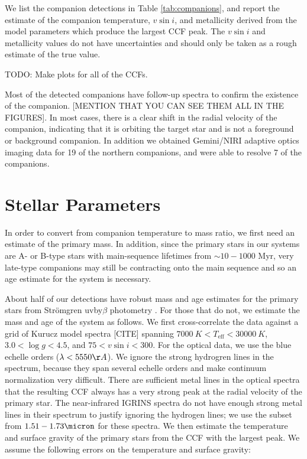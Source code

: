 \documentclass{emulateapj}
\begin{document}
We list the companion detections in Table \ref{tab:companions}, and report the estimate of the companion temperature, $v\sin{i}$, and metallicity derived from the model parameters which produce the largest CCF peak. The $v\sin{i}$ and metallicity values do not have uncertainties and should only be taken as a rough estimate of the true value. 

TODO: Make plots for all of the CCFs.

Most of the detected companions have follow-up spectra to confirm the existence of the companion. [MENTION THAT YOU CAN SEE THEM ALL IN THE FIGURES]. In most cases, there is a clear shift in the radial velocity of the companion, indicating that it is orbiting the target star and is not a foreground or background companion. In addition we obtained Gemini/NIRI adaptive optics imaging data for 19 of the northern companions, and were able to resolve 7 of the companions. 




\section{Stellar Parameters}
\label{sec:sp}

In order to convert from companion temperature to mass ratio, we first need an estimate of the primary mass. In addition, since the primary stars in our systems are A- or B-type stars with main-sequence lifetimes from $\sim 10 - 1000$ Myr, very late-type companions may still be contracting onto the main sequence and so an age estimate for the system is necessary. 

About half of our detections have robust mass and age estimates for the primary stars from Str\"omgren uvby$\beta$ photometry \citep{David2015}. For those that do not, we estimate the mass and age of the system as follows. We first cross-correlate the data against a grid of Kurucz model spectra [CITE] spanning $7000\ K < T_\mathrm{eff} < 30000\ K$, $3.0 < \log{g} < 4.5$, and $75 < v\sin{i} < 300$. For the optical data, we use the blue echelle orders ($\lambda < 5550 \AA$). We ignore the strong hydrogren lines in the spectrum, because they span several echelle orders and make continuum normalization very difficult. There are sufficient metal lines in the optical spectra that the resulting CCF always has a very strong peak at the radial velocity of the primary star. The near-infrared IGRINS spectra do not have enough strong metal lines in their spectrum to justify ignoring the hydrogen lines; we use the subset from $1.51 - 1.73 \micron$ for these spectra. We then estimate the temperature and surface gravity of the primary stars from the CCF with the largest peak. We assume the following errors on the temperature and surface gravity:
\end{document}

